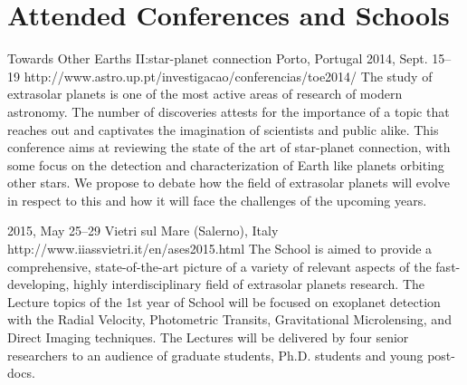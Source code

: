 \section{Attended Conferences and Schools}\label{app_sec:conferences}

{Towards Other Earths II:\@The star-planet connection}%
{Porto, Portugal}%
{2014, Sept. 15--19}%
{http://www.astro.up.pt/investigacao/conferencias/toe2014/}%
{}%
{The study of extrasolar planets is one of the most active areas of research of modern astronomy. The number of discoveries attests for the importance of a topic that reaches out and captivates the imagination of scientists and public alike. This conference aims at reviewing the state of the art of star-planet connection, with some focus on the detection and characterization of Earth like planets orbiting other stars. We propose to debate how the field of extrasolar planets will evolve in respect to this and how it will face the challenges of the upcoming years.}%

{2015, May 25--29}%
{Vietri sul Mare (Salerno), Italy}%
{http://www.iiassvietri.it/en/ases2015.html}%
{}%
{The School is aimed to provide a comprehensive, state-of-the-art picture of a variety of relevant aspects of the fast-developing, highly interdisciplinary field of extrasolar planets research.
The Lecture topics of the 1st year of School will be focused on exoplanet detection with the Radial Velocity, Photometric Transits, Gravitational Microlensing, and Direct Imaging techniques. The Lectures will be delivered by four senior researchers to an audience of graduate students, Ph.D. students and young post-docs.}%

